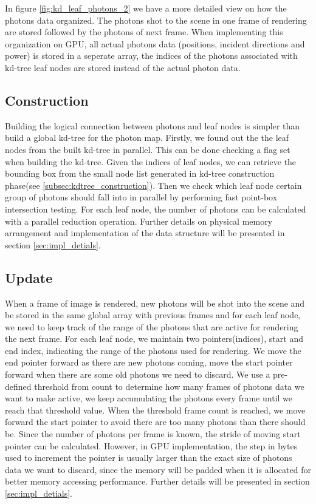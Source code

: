 In figure \ref{fig:kd_leaf_photons_2} we have a more detailed view on how the photons data organized. The photons shot to the scene in one frame of rendering are stored followed by the photons of next frame. When implementing this organization on GPU, all actual photons data (positions, incident directions and power) is stored in a seperate array, the indices of the photons associated with kd-tree leaf nodes are stored instead of the actual photon data. 

\subsection{Construction} 

Building the logical connection between photons and leaf nodes is simpler than build a global kd-tree for the photon map. Firstly, we found out the the leaf nodes from the built kd-tree in parallel. This can be done checking a flag set when building the kd-tree. Given the indices of leaf nodes, we can retrieve the bounding box from the small node list generated in kd-tree construction phase(see \ref{subsec:kdtree_construction}). Then we check which leaf node certain group of photons should fall into in parallel by performing fast point-box intersection testing. For each leaf node, the number of photons can be calculated with a parallel reduction operation. Further details on physical memory arrangement and implementation of the data structure  will be presented in section \ref{sec:impl_detials}. 

\subsection{Update} 

When a frame of image is rendered, new photons will be shot into the scene and be stored in the same global array with previous frames and for each leaf node, we need to keep track of the range of the photons that are active for rendering the next frame. For each leaf node, we maintain two pointers(indices), start and end index, indicating the range of the photons used for rendering. We move the end pointer forward as there are new photons coming, move the start pointer forward when there are some old photons we need to discard. We use a pre-defined threshold from count to determine how many frames of photons data we want to make active, we keep accumulating the photons every frame until we reach that threshold value. When the threshold frame count 
is reached, we move forward the start pointer to avoid there are too many photons than there should be. Since the number of photons per frame is known, the stride of moving start pointer can be calculated. However, in GPU implementation, the step in bytes used to increment the pointer is usually larger than the exact size of photons data we want to discard, since the memory will be padded when it is allocated for better memory accessing performance. Further details will be presented in section \ref{sec:impl_detials}. 


